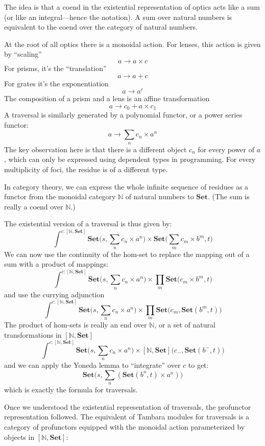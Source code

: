 \documentclass[11pt]{amsart}
\begin{document}
The idea is that a coend in the existential representation of optics acts like a sum (or like an integral---hence the notation). A sum over natural numbers is equivalent to the coend over the category of natural numbers. 

At the root of all optics there is a monoidal action. For lenses, this action is given by ``scaling''
\[ a \to a \times c \]
For prisms, it's the ``translation''
\[a \to a + c \]
For grates it's the exponentiation
\[a \to a^c \]
The composition of a prism and a lens is an affine transformation
\[a \to c_0 + a \times c_1 \]
A traversal is similarly generated by a polynomial functor, or a power series functor:
\[ a \to \sum_n c_n \times a^n \]
The key observation here is that there is a different object $c_n$ for every power of $a$, which can only be expressed using dependent types in programming. For every multiplicity of foci, the residue is of a different type. 

In category theory, we can express the whole infinite sequence of residues as a functor from the monoidal category $\mathbb{N}$ of natural numbers to $\mathbf{Set}$. (The sum is really a coend over $\mathbb{N}$.)

The existential version of a traversal is thus given by:
\[ \int^{c \colon [\mathbb{N}, \mathbf{Set}]}  \mathbf{Set}\big(s, \sum_n c_n \times a^n\big) \times  \mathbf{Set}\big( \sum_m c_m \times b^m, t\big) \]
We can now use the continuity of the hom-set to replace the mapping out of a sum with a product of mappings:
\[ \int^{c \colon [\mathbb{N}, \mathbf{Set}]}  \mathbf{Set}\big(s, \sum_n c_n \times a^n\big) \times  \prod_m \mathbf{Set}\big( c_m \times b^m, t\big) \]
and use the currying adjunction
\[  \int^{c \colon [\mathbb{N}, \mathbf{Set}]}  \mathbf{Set}\big(s, \sum_n c_n \times a^n\big) \times  \prod_m \mathbf{Set}\big( c_m, \mathbf{Set}( b^m, t)\big) \]
The product of hom-sets is really an end over $\mathbb{N}$, or a set of natural transformations in $[\mathbb{N}, \mathbf{Set}]$
\[  \int^{c \colon [\mathbb{N}, \mathbf{Set}]}  \mathbf{Set}\big(s, \sum_n c_n \times a^n\big) \times  [\mathbb{N}, \mathbf{Set}]\big( c_-, \mathbf{Set}( b^-, t)\big) \]
and we can apply the Yoneda lemma to ``integrate'' over $c$ to get:
\[ \mathbf{Set}(s, \sum_n ( \mathbf{Set}(b^n, t) \times a^n)\big) \]
which is exactly the formula for traversals.

Once we understood the existential representation of traversals, the profunctor representation followed. The equivalent of Tambara modules for traversals is a category of profunctors equipped with the monoidal action parameterized by objects in $[\mathbb{N}, \mathbf{Set}]$:
\end{document}

